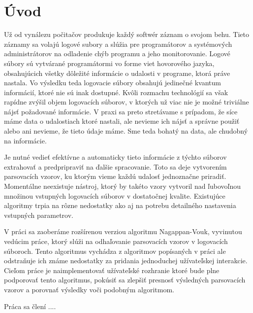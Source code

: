 \chapter{Úvod}

Už od vynálezu počitačov produkuje každý softwér záznam o svojom behu. Tieto záznamy sa volajú logové subory a slúžia pre programátorov a systémových administrátorov na odladenie chýb programu a jeho monitorovanie. Logové súbory sú vytvárané programátormi vo forme viet hovorového jazyka, obsahujúcich všetky dôležité informácie o udalosti v programe, ktorá práve nastala. Vo výsledku teda logovacie súbory obsahujú jedinečné kvantum informácií, ktoré nie sú inak dostupné. Kvôli rozmachu technológií sa však rapídne zvýšil objem logovacích súborov, v ktorých už viac nie je možné triviálne nájsť požadované informácie. V praxi sa preto stretávame s prípadom, že síce máme data o udalostiach ktoré nastali, ale nevieme ich nájsť a správne použiť alebo ani nevieme, že tieto údaje máme. Sme teda bohatý na data, ale chudobný na informácie.
\par Je nutné vedieť efektívne a automaticky tieto informácie z týchto súborov extrahovať a predpripraviť na ďalšie spracovanie. Toto sa deje vytvorením parsovacích vzorov, ku ktorým vieme každú udalosť jednoznačne priradiť. Momentálne neexistuje nástroj, ktorý by takéto vzory vytvoril nad ľubovoľnou množinou vstupných logovacích súborov v dostatočnej kvalite. Existujúce algoritmy trpia na rôzne nedostatky ako aj na potrebu detailného nastavenia vstupných parametrov.
\par V práci sa zaoberáme rozšírenou verziou algoritmu Nagappan-Vouk, vyvinutou vedúcim práce, ktorý slúži na odhaľovanie parsovacích vzorov v logovacích súboroch. Tento algoritmus vychádza z algoritmov popísaných v práci ale odstraňuje ich  známe nedostatky za pridania jednoduchej užívateľskej interakcie. Cieľom práce je naimplementovať užívateľské rozhranie ktoré bude plne podporovať tento algoritmus, pokúsiť sa zlepšiť presnosť výsledných parsovacích vzorov a porovnať výsledky voči podobným algoritmom.
 \par Práca sa člení ....